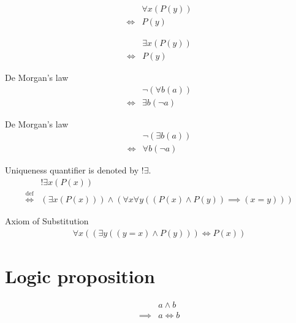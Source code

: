 \begin{axm}
\label{Axiom:forall_independent_variable}
\begin{align*}
& \forall x (P(y)) \\
\iff & P(y)
\end{align*}
\end{axm}

\begin{axm}
\label{Axiom:exists_independent_variable}
\begin{align*}
& \exists x (P(y)) \\
\iff & P(y)
\end{align*}
\end{axm}

\begin{prop}
\label{Proposition:De_Morgan_1}
De Morgan's law
\begin{align*}
& \lnot (\forall b (a)) \\
\iff & \exists b (\lnot a)
\end{align*}
\end{prop}

\begin{prop}
\label{Proposition:De_Morgan_2}
De Morgan's law
\begin{align*}
& \lnot (\exists b (a)) \\
\iff & \forall b (\lnot a)
\end{align*}
\end{prop}

\begin{defn}
\label{Definition:uniqueness_quantifier}
Uniqueness quantifier is denoted by $!\exists$.
\begin{align*}
& !\exists x (P(x)) \\
\overset{\operatorname{def}}{\iff} & (\exists x (P(x))) \land (\forall x \forall y ((P(x) \land P(y)) \implies (x = y)))
\end{align*}
\end{defn}

\begin{axm}
\label{Axiom:axiom_of_substitution}
Axiom of Substitution
\begin{align*}
\forall x ((\exists y ((y = x) \land P(y))) \iff P(x))
\end{align*}
\end{axm}

\section{Logic proposition}
\begin{prop}
\label{Proposition:land_implies_iff}
\begin{align*}
& a \land b \\
\implies & a \iff b
\end{align*}
\end{prop}

